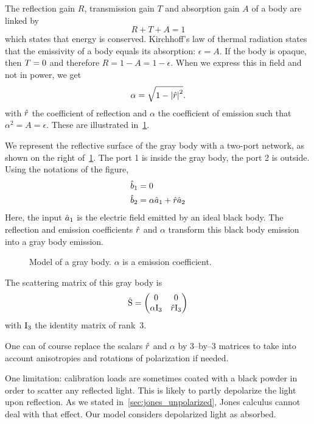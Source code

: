 The reflection gain $R$, transmission gain $T$ and absorption gain $A$ of a body are linked by
\begin{equation}
    R + T + A = 1
\end{equation}
which states that energy is conserved.
Kirchhoff's law of thermal radiation states that the emissivity of a body equals its absorption: $\epsilon = A$.
If the body is opaque, then $T=0$ and therefore $R=1-A=1-\epsilon$.
When we express this in field and not in power, we get
\begin{equation}
    \alpha = \sqrt{ 1 - \abs{\cp{r}}^2 } \text{.}
\end{equation}
with $\hat{r}$ the coefficient of reflection and $\alpha$ the coefficient of emission such that $\alpha^2=A=\epsilon$.
These are illustrated in~\cref{fig:gray_body}.

We represent the reflective surface of the gray body with a two-port network, as shown on the right of~\cref{fig:gray_body}.
The port 1 is inside the gray body, the port 2 is outside.
Using the notations of the figure,
\begin{align}
    \hat{b}_1 &= 0 \\
    \hat{b}_2 &= \alpha \hat{a}_1 + \hat{r} \hat{a}_2
\end{align}
Here, the input $\hat{a}_1$ is the electric field emitted by an ideal black body.
The reflection and emission coefficients $\hat{r}$ and $\alpha$ transform this black body emission into a gray body emission.

\begin{figure}[b]
    \centering
    
    \caption{Model of a gray body.
    $\alpha$ is a emission coefficient.}
    \label{fig:gray_body}
\end{figure}

The scattering matrix of this gray body is
\begin{equation}
    \hat{\mathrm{S}} =
    \begin{pmatrix}
        0 & 0 \\
        \alpha \mathrm{I}_3 & \hat{r} \mathrm{I}_3
    \end{pmatrix}
\end{equation}
with $\mathrm{I}_3$ the identity matrix of rank~3.

One can of course replace the scalars $\hat{r}$ and $\alpha$ by 3--by--3 matrices to take into account anisotropies and rotations of polarization if needed.

One limitation: calibration loads are sometimes coated with a black powder in order to scatter any reflected light.
This is likely to partly depolarize the light upon reflection.
As we stated in~\cref{sec:jones_unpolarized}, Jones calculus cannot deal with that effect.
Our model considers depolarized light as absorbed.


